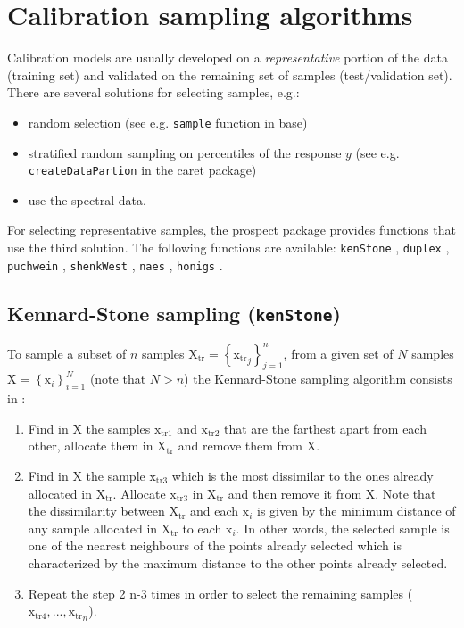 \documentclass[12pt]{article}\usepackage{graphicx, color}
\newcommand{\Rfunction}[1]{{\texttt{#1}}}
\newcommand{\Rpackage}[1]{{\mbox{\normalfont\textsf{#1}}}}
\begin{document}
\section{Calibration sampling algorithms }

Calibration models are usually developed on a \emph{representative} portion of the data (training set) and validated on the remaining set of samples (test/validation set). There are several solutions for selecting samples, e.g.:   
\begin{itemize}
  \item random selection (see e.g. \Rfunction{sample} function in \Rpackage{base})
  \item stratified random sampling on percentiles of the response $y$ (see e.g. \Rfunction{createDataPartion} in the \Rpackage{caret} package)
  \item  use the spectral data. 
\end{itemize}

For selecting representative samples, the \Rpackage{prospect} package provides functions that use the third solution. The following functions are available: \Rfunction{kenStone} \cite{kennard1969}, \Rfunction{duplex} \cite{snee1977}, \Rfunction{puchwein} \cite{puchwein1988}, \Rfunction{shenkWest} \cite{shenk1991}, \Rfunction{naes} \cite{naes2002}, \Rfunction{honigs} \cite{honigs1985}.

\subsection{Kennard-Stone sampling (\Rfunction{kenStone})}

To sample a subset of $n$  samples $\mathrm{X_{tr}} = \left \{ \mathrm{x_{tr}}_{j} \right \}_{j=1}^{n}$, from a given set of $N$ samples $\mathrm{X} = \left \{ \mathrm{x}_i \right \}_{i=1}^{N}$ (note that $N>n$) the Kennard-Stone sampling  algorithm consists in \cite{kennard1969}: 

\begin{enumerate}
  \item Find in $\mathrm{X}$ the samples $\mathrm{x_{tr1}}$ and  $\mathrm{x_{tr2}}$ that are the farthest apart from each other, allocate them in $\mathrm{X_{tr}}$  and remove them from $\mathrm{X}$.   
  \item Find in $\mathrm{X}$ the sample $\mathrm{x_{tr3}}$ which is the most dissimilar to the ones already allocated in $\mathrm{X_{tr}}$. Allocate $\mathrm{x_{tr3}}$ in $\mathrm{X_{tr}}$  and then remove it from $\mathrm{X}$. Note that the dissimilarity between $\mathrm{X_{tr}}$  and each $\mathrm{x}_i$  is given by the minimum distance of any sample allocated in $\mathrm{X_{tr}}$  to each $\mathrm{x}_i$. In other words, the selected sample is one of the nearest neighbours of the points already selected which is characterized by the maximum distance to the other points already selected.   
  \item Repeat the step 2 n-3 times in order to select the remaining samples ($\mathrm{x_{tr4}},..., \mathrm{x_{tr}}_n$).   

\end{enumerate}
\end{document}
